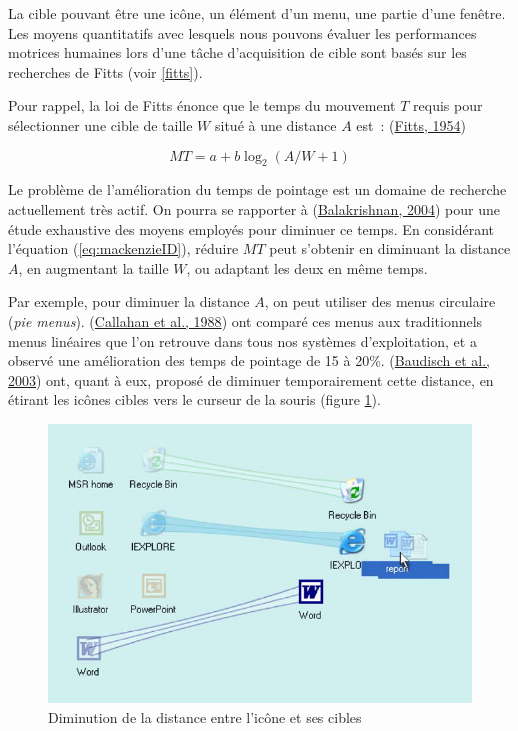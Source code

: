 \documentclass[
]{book}
\begin{document}
La cible pouvant être une icône, un élément d'un menu, une partie d'une
fenêtre. Les moyens quantitatifs avec lesquels nous pouvons évaluer les performances
motrices humaines lors d'une tâche d'acquisition de cible sont basés sur les
recherches de Fitts (voir \ref{fitts}).

Pour rappel, la loi de Fitts énonce que le temps du mouvement \(T\) requis
pour sélectionner une cible de taille \(W\) situé à une distance \(A\) est~:
(\protect\hyperlink{ref-fitts1954information}{Fitts, 1954})

\[ MT=a+b\log_{2}(A/W+1)\]

Le problème de l'amélioration du temps de pointage est un domaine de
recherche actuellement très actif. On pourra se rapporter à
(\protect\hyperlink{ref-balakrishnan2004beating}{Balakrishnan, 2004}) pour une étude exhaustive des moyens employés pour
diminuer ce temps. En considérant l'équation (\eqref{eq:mackenzieID}), réduire
\(MT\) peut s'obtenir en diminuant la distance \(A\), en augmentant la taille \(W\),
ou adaptant les deux en même temps.

Par exemple, pour diminuer la distance \(A\), on peut utiliser des menus
circulaire (\emph{pie menus}). (\protect\hyperlink{ref-callahan1988empirical}{Callahan et al., 1988}) ont comparé ces
menus aux traditionnels menus linéaires que l'on retrouve dans tous nos
systèmes d'exploitation, et a observé une amélioration des temps de pointage
de 15 à 20\%. (\protect\hyperlink{ref-baudisch2003drag}{Baudisch et al., 2003}) ont, quant à eux, proposé de diminuer
temporairement cette distance, en étirant les icônes cibles vers le curseur
de la souris (figure \ref{fig:diminution}).

\begin{figure}
\centering
\includegraphics{img/toto-002.png}
\caption{\label{fig:diminution}Diminution de la distance entre l'icône et ses
cibles}
\end{figure}
\end{document}
